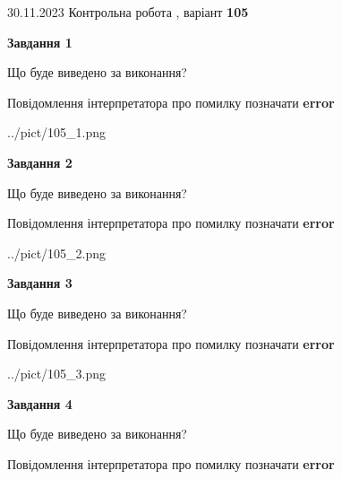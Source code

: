 \documentclass[12pt, ukrainian]{article}
\begin{document}
{{30.11.2023 Контрольна робота , варіант  \No \textbf { 105 }\par}}
{




{\begin {center}\textbf{Завдання 1}\end {center}}\par
Що буде виведено за виконання? \par
Повідомлення інтерпретатора про помилку позначати \textbf{error}

\begin{center}
	{../pict/105_1.png}
\end{center}
\newpage

{\begin {center}\textbf{Завдання 2}\end {center}}\par
Що буде виведено за виконання? \par
Повідомлення інтерпретатора про помилку позначати \textbf{error}

\begin{center}
	{../pict/105_2.png}
\end{center}
\newpage

{\begin {center}\textbf{Завдання 3}\end {center}}\par
Що буде виведено за виконання? \par
Повідомлення інтерпретатора про помилку позначати \textbf{error}

\begin{center}
	{../pict/105_3.png}
\end{center}
\newpage

{\begin {center}\textbf{Завдання 4}\end {center}}\par
Що буде виведено за виконання? \par
Повідомлення інтерпретатора про помилку позначати \textbf{error}

}
\end{document}
